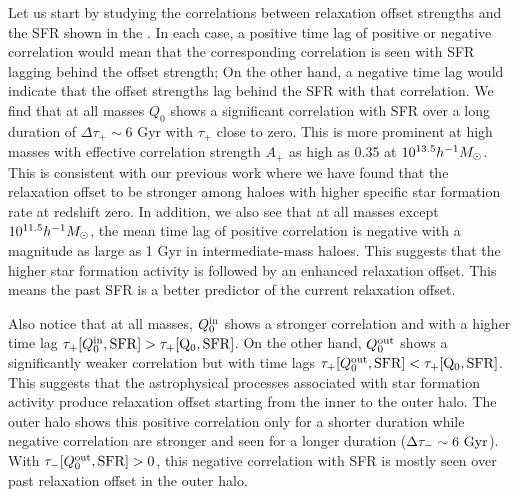 Let us start by studying the correlations between relaxation offset strengths and the SFR shown in the . In each case, a positive time lag of positive or negative correlation would mean that the corresponding correlation is seen with SFR lagging behind the offset strength; On the other hand, a negative time lag would indicate that the offset strengths lag behind the SFR with that correlation. We find that at all masses $Q_0$ shows a significant correlation with SFR over a long duration of $\Delta \tau_{+}\sim 6$ Gyr with $\tau_{+}$ close to zero. This is more prominent at high masses with effective correlation strength $A_{+}$ as high as $0.35$ at $10^{13.5} h^{-1}M_{\odot}$. This is consistent with our previous work \citep{2023Velmani&Paranjape} where we have found that the relaxation offset to be stronger among haloes with higher specific star formation rate at redshift zero. In addition, we also see that at all masses except $10^{11.5}h^{-1}M_{\odot}$, the mean time lag of positive correlation is negative with a magnitude as large as 1 Gyr in intermediate-mass haloes. This suggests that the higher star formation activity is followed by an enhanced relaxation offset. This means the past SFR is a better predictor of the current relaxation offset.

Also notice that at all masses, $Q_0^{\rm{in}}$ shows a stronger correlation and with a higher time lag $\tau_{+}[Q_0^{\rm{in}},\rm{SFR}] > \tau_{+}[Q_0,\rm{SFR}]$. On the other hand, $Q_0^{\rm{out}}$ shows a significantly weaker correlation but with time lags $\tau_{+}[Q_0^{\rm{out}},\rm{SFR}] < \tau_{+}[Q_0,\rm{SFR}]$. This suggests that the astrophysical processes associated with star formation activity produce relaxation offset starting from the inner to the outer halo. The outer halo shows this positive correlation only for a shorter duration while negative correlation are stronger and seen for a longer duration ($\Delta \tau_{-}\sim 6 ~\rm{Gyr}$). With $\tau_{-}[Q_0^{\rm{out}},\rm{SFR}]>0$, this negative correlation with SFR is mostly seen over past relaxation offset in the outer halo.


